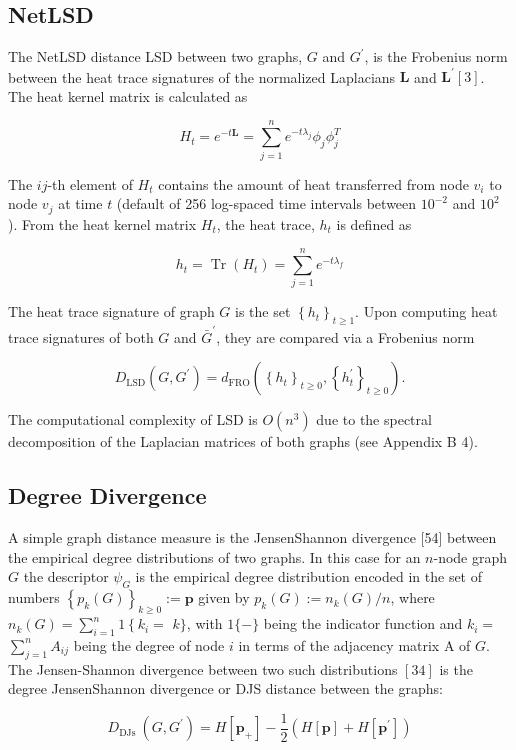 \subsection{NetLSD}
The NetLSD distance LSD between two graphs, $G$ and $G^{\prime}$, is the Frobenius norm between the heat trace signatures of the normalized Laplacians $\mathbf{L}$ and $\mathbf{L}^{\prime}[3]$. The heat kernel matrix is calculated as

$$
H_{t}=e^{-t \mathbf{L}}=\sum_{j=1}^{n} e^{-t \lambda_{j}} \phi_{j} \phi_{j}^{T}
$$

The $i j$-th element of $H_{t}$ contains the amount of heat transferred from node $v_{i}$ to node $v_{j}$ at time $t$ (default of 256 log-spaced time intervals between $10^{-2}$ and $10^{2}$ ). From the heat kernel matrix $H_{t}$, the heat trace, $h_{t}$ is defined as

$$
h_{t}=\operatorname{Tr}\left(H_{t}\right)=\sum_{j=1}^{n} e^{-t \lambda_{f}}
$$

The heat trace signature of graph $G$ is the set $\left\{h_{t}\right\}_{t \geq 1}$. Upon computing heat trace signatures of both $G$ and $\bar{G}^{\prime}$, they are compared via a Frobenius norm

$$
D_{\mathrm{LSD}}\left(G, G^{\prime}\right)=d_{\mathrm{FRO}}\left(\left\{h_{t}\right\}_{t \geq 0},\left\{h_{t}^{\prime}\right\}_{t \geq 0}\right) .
$$

The computational complexity of LSD is $O\left(n^{3}\right)$ due to the spectral decomposition of the Laplacian matrices of both graphs (see Appendix B 4).

\subsection{Degree Divergence}
A simple graph distance measure is the JensenShannon divergence [54] between the empirical degree distributions of two graphs. In this case for an $n$-node graph $G$ the descriptor $\psi_{G}$ is the empirical degree distribution encoded in the set of numbers $\left\{p_{k}(G)\right\}_{k \geq 0}:=\mathbf{p}$ given by $p_{k}(G):=n_{k}(G) / n$, where $n_{k}(G)=\sum_{i=1}^{n} 1\left\{k_{i}=\right.$ $k\}$, with $1\{-\}$ being the indicator function and $k_{i}=$ $\sum_{j=1}^{n} A_{i j}$ being the degree of node $i$ in terms of the adjacency matrix A of $G$. The Jensen-Shannon divergence between two such distributions $[34]$ is the degree JensenShannon divergence or DJS distance between the graphs:

$$
D_{\text {DJs }}\left(G, G^{\prime}\right)=H\left[\mathbf{p}_{+}\right]-\frac{1}{2}\left(H[\mathbf{p}]+H\left[\mathbf{p}^{\prime}\right]\right)
$$

